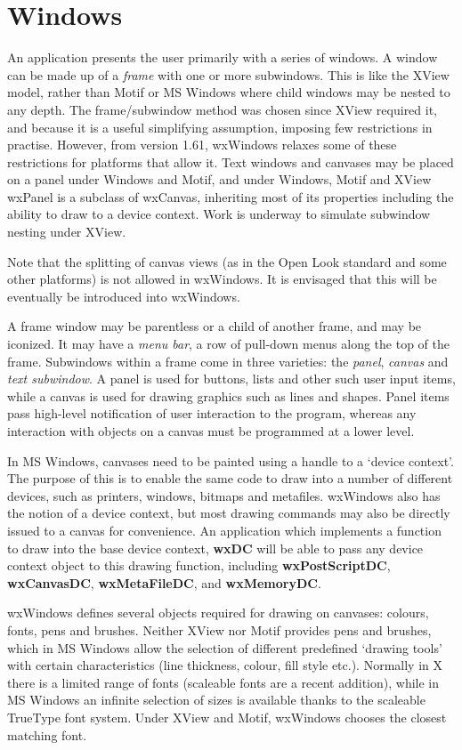 \section{Windows}

An application presents the user primarily with a series of windows. A
window can be made up of a {\it frame} with one or more subwindows. This
is like the XView model, rather than Motif or MS Windows where child
windows may be nested to any depth.  The frame/subwindow method was
chosen since XView required it, and because it is a useful simplifying
assumption, imposing few restrictions in practise. However, from version
1.61, wxWindows relaxes some of these restrictions for platforms that
allow it. Text windows and canvases may be placed on a panel under
Windows and Motif, and under Windows, Motif and XView wxPanel is a
subclass of wxCanvas, inheriting most of its properties including
the ability to draw to a device context. Work is underway to
simulate subwindow nesting under XView.

Note that the splitting of canvas views (as in the Open Look standard
and some other platforms) is not allowed in wxWindows. It is envisaged
that this will be eventually be introduced into wxWindows.

A frame window may be parentless or a child of another frame, and may
be iconized. It may have a {\it menu bar}, a row of pull-down menus
along the top of the frame.  Subwindows within a frame come in three
varieties: the {\it panel}, {\it canvas} and {\it text subwindow}.  A
panel is used for buttons, lists and other such user input items, while
a canvas is used for drawing graphics such as lines and shapes.  Panel
items pass high-level notification of user interaction to the program,
whereas any interaction with objects on a canvas must be programmed at a
lower level.

In MS Windows, canvases need to be painted using a handle to a `device
context'. The purpose of this is to enable the same code to draw into a
number of different devices, such as printers, windows, bitmaps and
metafiles. wxWindows also has the notion of a device context, but most
drawing commands may also be directly issued to a canvas for
convenience. An application which implements a function to draw into the
base device context, {\bf wxDC} will be able to pass any device context
object to this drawing function, including {\bf wxPostScriptDC}, {\bf wxCanvasDC},
{\bf wxMetaFileDC}, and {\bf wxMemoryDC}.

wxWindows defines several objects required for drawing on canvases:
colours, fonts, pens and brushes. Neither XView nor Motif provides pens
and brushes, which in MS Windows allow the selection of different
predefined `drawing tools' with certain characteristics (line thickness,
colour, fill style etc.). Normally in X there is a limited range of
fonts (scaleable fonts are a recent addition), while in MS Windows an
infinite selection of sizes is available thanks to the scaleable
TrueType font system. Under XView and Motif, wxWindows chooses the closest
matching font.

